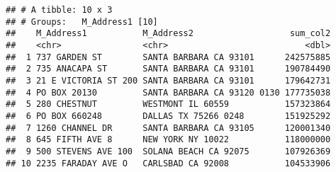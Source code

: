 \documentclass[]{article}
\newenvironment{Shaded}{\begin{snugshade}}{\end{snugshade}}
\newcommand{\KeywordTok}[1]{\textcolor[rgb]{0.13,0.29,0.53}{\textbf{#1}}}
\newcommand{\DataTypeTok}[1]{\textcolor[rgb]{0.13,0.29,0.53}{#1}}
\newcommand{\DecValTok}[1]{\textcolor[rgb]{0.00,0.00,0.81}{#1}}
\newcommand{\StringTok}[1]{\textcolor[rgb]{0.31,0.60,0.02}{#1}}
\newcommand{\CommentTok}[1]{\textcolor[rgb]{0.56,0.35,0.01}{\textit{#1}}}
\newcommand{\OperatorTok}[1]{\textcolor[rgb]{0.81,0.36,0.00}{\textbf{#1}}}
\newcommand{\NormalTok}[1]{#1}
\begin{document}
\begin{Shaded}
\end{Shaded}

\begin{verbatim}
## # A tibble: 10 x 3
## # Groups:   M_Address1 [10]
##    M_Address1           M_Address2                   sum_col2
##    <chr>                <chr>                           <dbl>
##  1 737 GARDEN ST        SANTA BARBARA CA 93101      242575885
##  2 735 ANACAPA ST       SANTA BARBARA CA 93101      190784490
##  3 21 E VICTORIA ST 200 SANTA BARBARA CA 93101      179642731
##  4 PO BOX 20130         SANTA BARBARA CA 93120 0130 177735038
##  5 280 CHESTNUT         WESTMONT IL 60559           157323864
##  6 PO BOX 660248        DALLAS TX 75266 0248        151925292
##  7 1260 CHANNEL DR      SANTA BARBARA CA 93105      120001340
##  8 645 FIFTH AVE 8      NEW YORK NY 10022           118000000
##  9 500 STEVENS AVE 100  SOLANA BEACH CA 92075       107926369
## 10 2235 FARADAY AVE O   CARLSBAD CA 92008           104533906
\end{verbatim}
\end{document}
